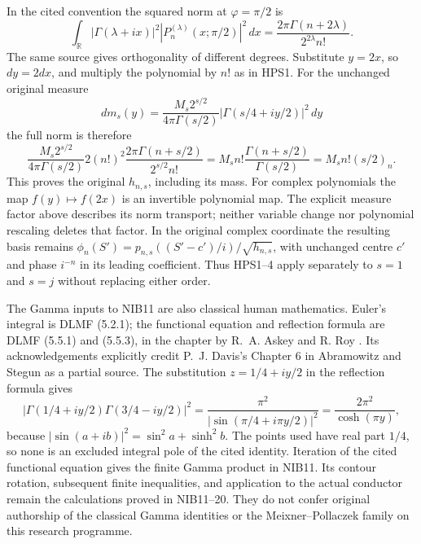 \documentclass[11pt,a4paper]{article}
\begin{document}
In the cited convention the squared norm at $\varphi=\pi/2$ is
\[
 \int_{\mathbb R}|\Gamma(\lambda+ix)|^2
       |P_n^{(\lambda)}(x;\pi/2)|^2\,dx
       =\frac{2\pi\Gamma(n+2\lambda)}{2^{2\lambda}n!}.
                                                               \tag{HPS3}
\]
The same source gives orthogonality of different degrees. Substitute
$y=2x$, so $dy=2dx$, and multiply the polynomial by $n!$ as in HPS1.
For the unchanged original measure
\[
 dm_s(y)=\frac{M_s2^{s/2}}{4\pi\Gamma(s/2)}
                  |\Gamma(s/4+iy/2)|^2\,dy
\]
the full norm is therefore
\[
 \frac{M_s2^{s/2}}{4\pi\Gamma(s/2)}
  2(n!)^2\frac{2\pi\Gamma(n+s/2)}{2^{s/2}n!}
   =M_sn!\frac{\Gamma(n+s/2)}{\Gamma(s/2)}
   =M_sn!(s/2)_n.                                      \tag{HPS4}
\]
This proves the original $h_{n,s}$, including its mass. For complex
polynomials the map $f(y)\mapsto f(2x)$ is an invertible polynomial
map. The explicit measure factor above describes its norm transport;
neither variable change nor polynomial rescaling deletes that factor.
In the original complex coordinate the resulting basis remains
$\phi_n(S')=p_{n,s}((S'-c')/i)/\sqrt{h_{n,s}}$, with unchanged centre
$c'$ and phase $i^{-n}$ in its leading coefficient. Thus HPS1--4
apply separately to $s=1$ and $s=j$ without replacing either order.

The Gamma inputs to NIB11 are also classical human mathematics.
Euler's integral is DLMF (5.2.1); the functional equation and reflection
formula are DLMF (5.5.1) and (5.5.3), in the chapter by R.~A. Askey
and R. Roy \cite{human:dlmf5}. Its acknowledgements explicitly credit
P.~J. Davis's Chapter 6 in Abramowitz and Stegun as a partial source.
The substitution $z=1/4+iy/2$ in the reflection formula gives
\[
 |\Gamma(1/4+iy/2)\Gamma(3/4-iy/2)|^2
 =\frac{\pi^2}{|\sin(\pi/4+i\pi y/2)|^2}
 =\frac{2\pi^2}{\cosh(\pi y)},                         \tag{HPS5}
\]
because $|\sin(a+ib)|^2=\sin^2a+\sinh^2b$. The points used have
real part $1/4$, so none is an excluded integral pole of the cited
identity. Iteration of the cited functional equation gives the
finite Gamma product in NIB11. Its contour rotation, subsequent
finite inequalities, and application to the actual conductor
remain the calculations proved in NIB11--20. They do not confer
original authorship of the classical Gamma identities or the
Meixner--Pollaczek family on this research programme.
\endgroup
\label{MTBUILD:NIB_SOURCE_ATTRIBUTION:end}


\clearpage
\renewcommand{\thesection}{R\arabic{section}}
\setcounter{section}{0}
\end{document}
